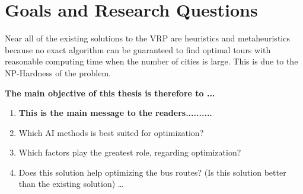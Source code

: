 \section{Goals and Research Questions}

Near all of the existing solutions to the VRP are heuristics and metaheuristics because no exact algorithm can be guaranteed to find optimal tours with reasonable computing time when the number of cities is large. This is due to the NP-Hardness of the problem.

\textbf{The main objective of this thesis is therefore to ... }
\begin{enumerate}
  \item \textbf{This is the main message to the readers..........}
  \item Which AI methods is best suited for optimization?
  \item Which factors play the greatest role, regarding optimization?
  \item Does this solution help optimizing the bus routes? (Is this solution better than the existing solution)
   \ldots
\end{enumerate}